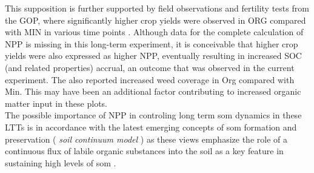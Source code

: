 \documentclass[12pt]{report}
\begin{document}
		This supposition is further supported by field observations and fertility tests from the GOP, where significantly higher crop yields were observed in ORG compared with MIN in various time points . Although data for the complete calculation of NPP is missing in this long-term experiment, it is conceivable that higher crop yields were also expressed as higher NPP, eventually resulting in increased SOC (and related properties) accrual, an outcome that was observed in the current experiment. The  also reported increased weed coverage in Org compared with Min. This may have been an additional factor contributing to increased organic matter input in these plots.\\
		The possible importance of NPP in controling long term \gls{som} dynamics in these LTTs is in accordance with the latest emerging concepts of \gls{som} formation and preservation (\textit{ soil continuum model} ) as these views emphasize the role of a continuous flux of labile organic substances into the soil as a key feature in sustaining high levels of \gls{som} \cite{kleber2010, lehmann2015}.
		
\end{document}
